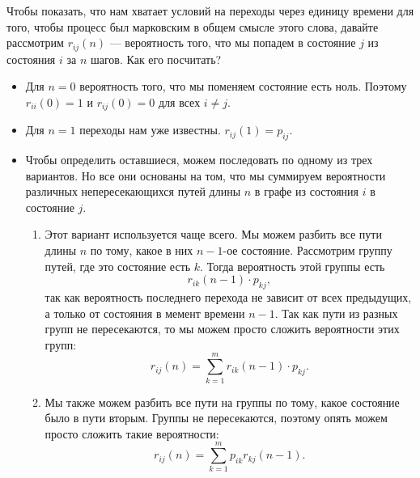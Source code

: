 \documentclass[12pt]{article}
\begin{document}
Чтобы показать, что нам хватает условий на переходы через единицу времени для того, чтобы процесс был марковским в общем смысле этого слова, давайте рассмотрим $r_{ij}(n)$ --- вероятность того, что мы попадем в состояние $j$ из состояния $i$ за $n$ шагов. Как его посчитать?
\begin{itemize}
  \item Для $n = 0$ вероятность того, что мы поменяем состояние есть ноль. Поэтому $r_{ii}(0) = 1$ и $r_{ij}(0) = 0$ для всех $i \ne j$.
  \item Для $n = 1$ переходы нам уже известны. $r_{ij}(1) = p_{ij}$.
  \item Чтобы определить оставшиеся, можем последовать по одному из трех вариантов. Но все они основаны на том, что мы суммируем вероятности различных непересекающихся путей длины $n$ в графе из состояния $i$ в состояние $j$.
  \begin{enumerate}
    \item Этот вариант используется чаще всего. Мы можем разбить все пути длины $n$ по тому, какое в них $n-1$-ое состояние. Рассмотрим группу путей, где это состояние есть $k$. Тогда вероятность этой группы есть
    \[
      r_{ik}(n-1) \cdot p_{kj},
    \]
    так как вероятность последнего перехода не зависит от всех предыдущих, а только от состояния в мемент времени $n - 1$. Так как пути из разных групп не пересекаются, то мы можем просто сложить вероятности этих групп:
    \[
      r_{ij}(n) = \sum_{k = 1}^m r_{ik}(n-1) \cdot p_{kj}.
    \]
    \begin{center}
    \end{center}
    \item Мы также можем разбить все пути на группы по тому, какое состояние было в пути вторым. Группы не пересекаются, поэтому опять можем просто сложить такие вероятности:
    \[
      r_{ij}(n) = \sum_{k = 1}^m p_{ik} r_{kj}(n-1).
    \]
    \begin{center}
\end{center}
\end{enumerate}
\end{itemize}
\end{document}
